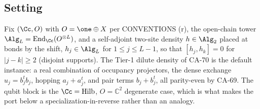 
\subsection{Setting}

Fix \((\Cc,O)\) with \(O=\one\oplus X\) per CONVENTIONS (r), the open-chain
tower \(\Alg_L=\operatorname{End}_{\Cc}(O^{\otimes L})\), and a self-adjoint
two-site density \(h\in\Alg_2\) placed at bonds by the shift,
\(h_j\in\Alg_L\) for \(1\le j\le L-1\), so that \([h_j,h_k]=0\) for
\(|j-k|\ge2\) (disjoint supports).  The Tier-1 dilute density of CA-70 is
the default instance: a real combination of occupancy projectors, the dense
exchange \(u_j=b_j^tb_j\), hopping \(a_j+a_j^t\), and pair terms
\(b_j+b_j^t\), all parity-even by CA-69.  The qubit block is the
\(\Cc=\mathrm{Hilb}\), \(O=\mathbb C^2\) degenerate case, which is what
makes the port below a specialization-in-reverse rather than an analogy.

